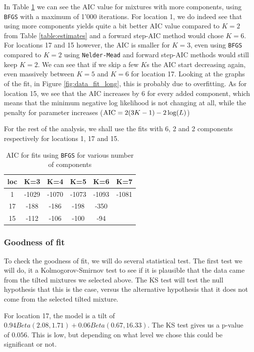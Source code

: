 In Table \ref{table:AIC} we can see the AIC value for mixtures with more components, using \texttt{BFGS} with a maximum of 1'000 iterations. For location 1, we do indeed see that using more components yields quite a bit better AIC value compared to $K=2$ from Table \ref{table:estimates} and a forward step-AIC method would chose $K=6$. For locations 17 and 15 however, the AIC is smaller for $K=3$, even using \texttt{BFGS} compared to $K=2$ using \texttt{Nelder-Mead} and forward step-AIC methods would still keep $K=2$. We can see that if we skip a few $K$s the AIC start decreasing again, even massively between $K=5$ and $K=6$ for location 17. Looking at the graphs of the fit, in Figure \ref{fig:data_fit_long}, this is probably due to overfitting. 
As for location 15, we see that the AIC increases by 6 for every added component, which means that the minimum negative log likelihood is not changing at all, while the penalty for parameter increases (${\rm AIC} = 2(3K-1) - 2\log(L)$)

For the rest of the analysis, we shall use the fits with 6, 2 and 2 components respectively for locations 1, 17 and 15.

\begin{table}
\centering
\begin{tabular}{|c||c|c|c|c|c|}
\hline
loc & K=3 & K=4 & K=5 & K=6 & K=7\\
\hline
1 & -1029 & -1070 & -1073 & -1093 & -1081 \\
17 & -188 & -186 & -198 & -350 & \\
15 & -112 & -106 & -100 & -94 & \\
\hline
\end{tabular}
\caption{AIC for fits using \texttt{BFGS} for various number of components}
\label{table:AIC}
\end{table}

\subsubsection{Goodness of fit}
To check the goodness of fit, we will do several statistical test. The first test we will do, it a Kolmogorov-Smirnov test to see if it is plausible that the data came from the tilted mixtures we selected above. The KS test will test the null hypothesis that this is the case, versus the alternative hypothesis that it does not come from the selected tilted mixture.



For location 17, the model is a tilt of $0.94Beta(2.08,1.71) + 0.06Beta(0.67, 16.33)$. The KS test gives us a p-value of $0.056$. This is low, but depending on what level we chose this could be significant or not.

